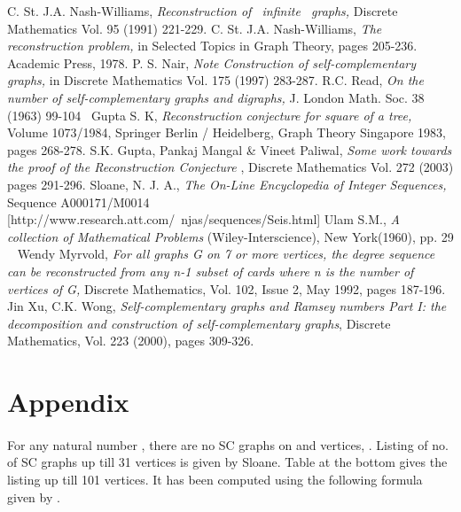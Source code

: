 \documentclass[12pt,conference]{IEEEtran}
\begin{document}
\begin{thebibliography}{}
C. St. J.A. Nash-Williams, \emph{Reconstruction  of  infinite  graphs,} Discrete Mathematics Vol. 95 (1991) 221-229. 
C. St. J.A. Nash-Williams, \emph{The reconstruction problem,} in Selected Topics in Graph Theory, pages 205-236. Academic Press, 1978. 
P. S. Nair, \emph{Note Construction of self-complementary graphs,} in Discrete Mathematics Vol. 175 (1997) 283-287.
R.C. Read, \emph{On the number of self-complementary graphs and digraphs,} J. London Math. Soc. 38 (1963) 99-104 
Gupta S. K, \emph{Reconstruction conjecture for square of a tree,} Volume 1073/1984, Springer Berlin / Heidelberg, Graph Theory Singapore 1983, pages 268-278. 
S.K. Gupta, Pankaj Mangal \& Vineet Paliwal, \emph{Some work towards the proof of the Reconstruction Conjecture }, Discrete Mathematics Vol. 272 (2003) pages 291-296.
Sloane, N. J. A., \emph{The On-Line Encyclopedia of Integer Sequences,} Sequence A000171/M0014 [http://www.research.att.com/~njas/sequences/Seis.html] 
Ulam S.M., \emph{A collection of Mathematical Problems} (Wiley-Interscience), New York(1960), pp. 29   
Wendy Myrvold, \emph{For all graphs G on 7 or more vertices, the degree sequence can be reconstructed from any n-1 subset of cards where n is the number of vertices of G,} Discrete Mathematics, Vol. 102, Issue 2, May 1992, pages 187-196.
Jin Xu, C.K. Wong, \emph{Self-complementary graphs and Ramsey numbers Part I: the decomposition and construction of self-complementary graphs}, Discrete Mathematics, Vol. 223 (2000), pages 309-326.
\\
\end{thebibliography}

\newpage
\section* {Appendix} 
\paragraph*{} For any natural number , there are no SC graphs on  and  vertices, \cite{r1}. Listing of no. of SC graphs up till 31 vertices is given by Sloane\cite{s3}.
 Table at the bottom gives the listing up till 101 vertices. It has been computed using the following formula given by \cite{r1}. \\
\end{document}
